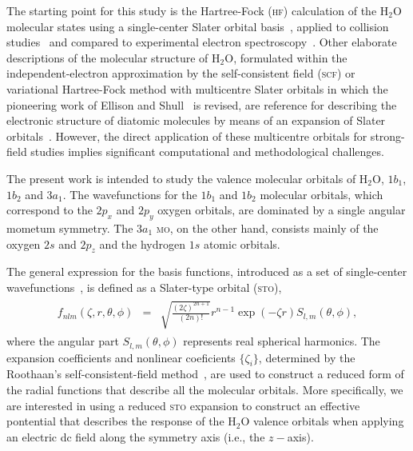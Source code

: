 The starting point for this study is the Hartree-Fock (\textsc{hf})
calculation of the H$_{2}$O molecular states using a single-center
Slater orbital
basis~\cite{Moccia_1964,Moccia_JCP_2164,Moccia_JCP_2176}, applied to
collision studies~\cite{Montanari_2013} and compared to experimental
electron spectroscopy~\cite{Hafied_2007}. Other elaborate descriptions
of the molecular structure of H$_{2}$O, formulated within the
independent-electron approximation by the self-consistent field
(\textsc{scf}) or variational Hartree-Fock method with multicentre
Slater orbitals in which the pioneering work of Ellison and
Shull~\cite{EllisonShullh2o_1955} is revised, are reference for
describing the electronic structure of diatomic molecules by means of
an expansion of Slater
orbitals~\cite{Pitzer_1968,Pitzer_1970}. However, the direct
application of these multicentre orbitals for strong-field studies
implies significant computational and methodological challenges.

The present work is intended to study the valence molecular orbitals
of H$_{2}$O, $1b_{1}$, $1b_{2}$ and $3a_{1}$. The wavefunctions for
the $1b_{1}$ and $1b_{2}$ molecular orbitals, which correspond to the
$2p_{x}$ and $2p_{y}$ oxygen orbitals, are dominated by a single
angular mometum symmetry. The $3a_{1}$ \textsc{mo}, on the other hand,
consists mainly of the oxygen $2s$ and $2p_{z}$ and the hydrogen $1s$
atomic orbitals.

The general expression for the basis functions, introduced as a set of
single-center
wavefunctions~\cite{Moccia_1964,Moccia_JCP_2164,Moccia_JCP_2176}, is
defined as a Slater-type orbital (\textsc{sto}),
%
\begin{eqnarray}
  \begin{split}
 f_{nlm}(\zeta,r,\theta,\phi) & = & \sqrt{\frac{(2\zeta)^{2n+1}}{(2n)!}}
 r^{n-1} \exp(-\zeta r) S_{l, m}(\theta,\phi),
 \end{split}
\label{eq:sto}
\end{eqnarray}
%
where the angular part $S_{l,m}(\theta,\phi)$ represents real
spherical harmonics. The expansion coefficients and nonlinear
coeficients $\{\zeta_{i}\}$, determined by the Roothaan's
self-consistent-field method~\cite{Moccia_1964,Roothaan_1951}, are
used to construct a reduced form of the radial functions that describe
all the molecular orbitals. More specifically, we are interested in
using a reduced \textsc{sto} expansion to construct an effective
pontential that describes the response of the H$_{2}$O valence
orbitals when applying an electric dc field along the symmetry axis
(i.e., the $z-$axis).

